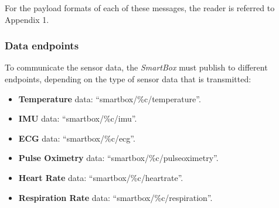 For the payload formats of each of these messages, the reader is referred to Appendix 1.

\subsubsection{Data endpoints}
To communicate the sensor data, the \textit{SmartBox} must publish to different endpoints, depending on the type of sensor data that is transmitted:

\begin{itemize}
    \item \textbf{Temperature} data: ``smartbox/\%c/temperature''.
    \item \textbf{\acf{IMU}} data: ``smartbox/\%c/imu''.
    \item \textbf{\acf{ECG}} data: ``smartbox/\%c/ecg''.
    \item \textbf{Pulse Oximetry} data: ``smartbox/\%c/pulseoximetry''.
    \item \textbf{Heart Rate} data: ``smartbox/\%c/heartrate''.
    \item \textbf{Respiration Rate} data: ``smartbox/\%c/respiration''.
\end{itemize}

